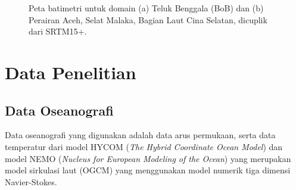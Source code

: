 \begin{spacing}{1.5}
\begin{figure}[H]
		\caption{Peta batimetri untuk domain (a) Teluk Benggala (BoB) dan (b) Perairan Aceh, Selat Malaka, Bagian Laut Cina Selatan, dicuplik dari SRTM15+.}
		\label{fig:domain}
	\end{figure}

\end{spacing}
\vspace{-1pc}
\section[Data Penelitian]{Data Penelitian}
\begin{spacing}{1.5}
\vspace{-1pc}
\subsection[Data Oseanografi]{Data Oseanografi}
	Data oseanografi yang digunakan adalah data arus permukaan, serta data temperatur dari model HYCOM (\textit{The Hybrid Coordinate Ocean Model}) dan model NEMO (\textit{Nucleus for European Modeling of the Ocean}) yang merupakan model sirkulasi laut (OGCM) yang menggunakan model numerik tiga dimensi Navier-Stokes.


\end{spacing}
